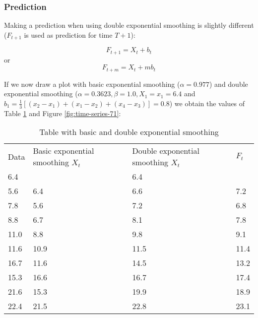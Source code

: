 \subsubsection{Prediction}

Making a prediction when using double exponential smoothing is slightly different ($F_{t+1}$ is used as prediction for time $T+1$):

\[ F_{t+1} = X_{t} + b_{t} \]
or
\[ F_{t+m} = X_{t} + m b_{t} \]

If we now draw a plot with basic exponential smoothing ($\alpha = 0.977$) and double exponential smoothing ($\alpha = 0.3623, \beta = 1.0, X_{1} = x_{1} = 6.4$ and $b_{1} = \frac{1}{3}\left[ (x_{2} - x_{1}) + (x_{1} - x_{2}) + (x_{4} - x_{3}) \right] = 0.8$) we obtain the values of Table \ref{tab:doubleSingle} and Figure \ref{fig:time-series-71}:

\begin{table}
  \centering
  \begin{tabular}{|llll|}
    \hline
    Data & Basic exponential smoothing $X_{t}$ & Double exponential smoothing $X_{t}$ & $F_{t}$ \\
    6.4  & ~                      & 6.4              & ~                             \\
    5.6  & 6.4                    & 6.6              & 7.2                           \\
    7.8  & 5.6                    & 7.2              & 6.8                           \\
    8.8  & 6.7                    & 8.1              & 7.8                           \\
    11.0 & 8.8                    & 9.8              & 9.1                           \\
    11.6 & 10.9                   & 11.5             & 11.4                          \\
    16.7 & 11.6                   & 14.5             & 13.2                          \\
    15.3 & 16.6                   & 16.7             & 17.4                          \\
    21.6 & 15.3                   & 19.9             & 18.9                          \\
    22.4 & 21.5                   & 22.8             & 23.1                          \\ \hline
  \end{tabular}
  \caption{Table with basic and double exponential smoothing}
  \label{tab:doubleSingle}
\end{table}


